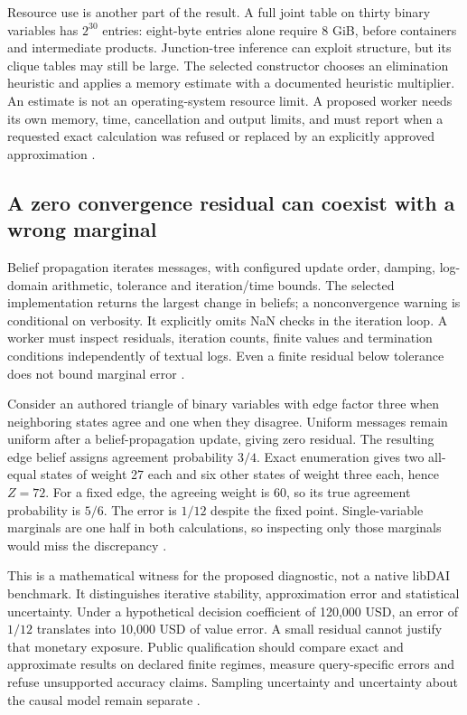 Resource use is another part of the result. A full joint table on thirty
binary variables has $2^{30}$ entries: eight-byte entries alone require
8 GiB, before containers and intermediate products. Junction-tree inference
can exploit structure, but its clique tables may still be large. The
selected constructor chooses an elimination heuristic and applies a memory
estimate with a documented heuristic multiplier. An estimate is not an
operating-system resource limit. A proposed worker needs its own memory,
time, cancellation and output limits, and must report when a requested
exact calculation was refused or replaced by an explicitly approved
approximation \cite{exec24_libdai_source,exec24_libdai_choice}.

\subsection{A zero convergence residual can coexist with a wrong marginal}
Belief propagation iterates messages, with configured update order, damping,
log-domain arithmetic, tolerance and iteration/time bounds. The selected
implementation returns the largest change in beliefs; a nonconvergence
warning is conditional on verbosity. It explicitly omits NaN checks in the
iteration loop. A worker must inspect residuals, iteration counts, finite
values and termination conditions independently of textual logs. Even a
finite residual below tolerance does not bound marginal error
\cite{exec24_libdai_source}.

Consider an authored triangle of binary variables with edge factor three
when neighboring states agree and one when they disagree. Uniform messages
remain uniform after a belief-propagation update, giving zero residual.
The resulting edge belief assigns agreement probability $3/4$. Exact
enumeration gives two all-equal states of weight 27 each and six other
states of weight three each, hence $Z=72$. For a fixed edge, the agreeing
weight is 60, so its true agreement probability is $5/6$. The error is
$1/12$ despite the fixed point. Single-variable marginals are one half in
both calculations, so inspecting only those marginals would miss the
discrepancy \cite{exec24_libdai_choice}.

This is a mathematical witness for the proposed diagnostic, not a native
libDAI benchmark. It distinguishes iterative stability, approximation error
and statistical uncertainty. Under a hypothetical decision coefficient of
120,000 USD, an error of $1/12$ translates into 10,000 USD of value error.
A small residual cannot justify that monetary exposure. Public qualification
should compare exact and approximate results on declared finite regimes,
measure query-specific errors and refuse unsupported accuracy claims.
Sampling uncertainty and uncertainty about the causal model remain separate
\cite{exec24_libdai_choice}.

